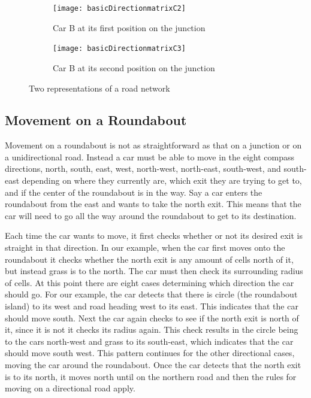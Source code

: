 \documentclass{article}
\begin{document}
	\begin{figure}[H]
		\centering
		
		\begin{subfigure}{0.45\textwidth}
			\centering
			\texttt{[image: basicDirectionmatrixC2]}
			\caption{Car B at its first position on the junction}
			\label{FirstMove}
		\end{subfigure}
		\qquad
		\begin{subfigure}{0.45\textwidth}
			\centering
			\texttt{[image: basicDirectionmatrixC3]}
			\caption{Car B at its second position on the junction}
			\label{SecondMove}
		\end{subfigure}
		\caption{Two representations of a road network}
		\label{Car B in a junction}
	\end{figure}


\subsection{Movement on a Roundabout}\label{movementOnARoundabout}

Movement on a roundabout is not as straightforward as that on a junction or on a unidirectional road. Instead a car must be able to move in the eight compass directions, north, south, east, west, north-west, north-east, south-west, and south-east depending on where they currently are, which exit they are trying to get to, and if the center of the roundabout is in the way. Say a car enters the roundabout from the east and wants to take the north exit. This means that the car will need to go all the way around the roundabout to get to its destination. 

Each time the car wants to move, it first checks whether or not its desired exit is straight in that direction. In our example, when the car first moves onto the roundabout it checks whether the north exit is any amount of cells north of it, but instead grass is to the north. The car must then check its surrounding radius of cells. At this point there are eight cases determining which direction the car should go. For our example, the car detects that there is circle (the roundabout island) to its west and road heading west to its east. This indicates that the car should move south. Next the car again checks to see if the north exit is north of it, since it is not it checks its radius again. This check results in the circle being to the cars north-west and grass to its south-east, which indicates that the car should move south west. This pattern continues for the other directional cases, moving the car around the roundabout. Once the car detects that the north exit is to its north, it moves north until on the northern road and then the rules for moving on a directional road apply.
\end{document}
